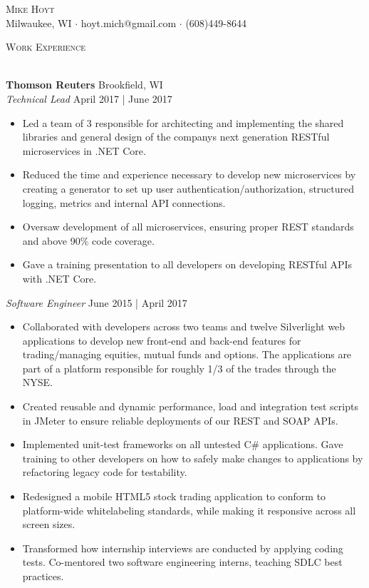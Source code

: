 \documentclass[a4paper]{article}
\newcommand{\lineunder} {
    \vspace*{-8pt} \\
    \hspace*{-18pt} \hrulefill \\
}
\newcommand{\header} [1] {
    {\hspace*{-18pt}\vspace*{6pt} \textsc{#1}}
    \vspace*{-6pt} \lineunder
}
\begin{document}
\vspace*{-40pt}

    

\vspace*{-10pt}
\begin{center}
	{\Huge \scshape {Mike Hoyt}}\\
	Milwaukee, WI $\cdot$ hoyt.mich@gmail.com $\cdot$ (608)449-8644\\
\end{center}


\header{Work Experience}
\vspace{1mm}

\textbf{Thomson Reuters} \hfill Brookfield, WI\\
\textit{Technical Lead} \hfill April 2017 | June 2017\\
\vspace{-1mm}
\begin{itemize} \itemsep 1pt
	\item Led a team of 3 responsible for architecting and implementing the shared libraries and general design of the company\textquotesingle{}s next generation RESTful microservices in .NET Core.
	\item Reduced the time and experience necessary to develop new microservices by creating a generator to set up user authentication/authorization, structured logging, metrics and internal API connections.
	\item Oversaw development of all microservices, ensuring proper REST standards and above 90\% code coverage.
	\item Gave a training presentation to all developers on developing RESTful APIs with .NET Core.
\end{itemize}
\vspace{-1mm}
\textit{Software Engineer} \hfill June 2015 | April 2017\\
\vspace{-1mm}
\begin{itemize} \itemsep 1pt
	\item Collaborated with developers across two teams and twelve Silverlight web applications to develop new front-end and back-end features for trading/managing equities, mutual funds and options. The applications are part of a platform responsible for roughly 1/3 of the trades through the NYSE.
	\item Created reusable and dynamic performance, load and integration test scripts in JMeter to ensure reliable deployments of our REST and SOAP APIs.
	\item Implemented unit-test frameworks on all untested C\# applications. Gave training to other developers on how to safely make changes to applications by refactoring legacy code   for testability.
	\item Redesigned a mobile HTML5 stock trading application to conform to platform-wide whitelabeling standards, while making it responsive across all screen sizes.
	\item Transformed how internship interviews are conducted by applying coding tests. Co-mentored two software engineering interns, teaching SDLC best practices.
\end{itemize}
\end{document}

